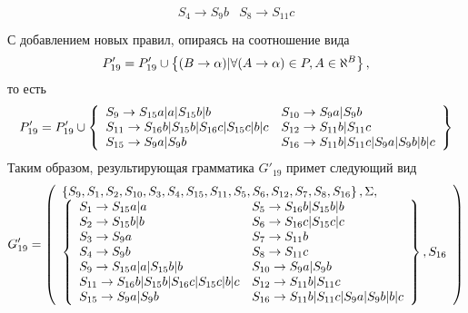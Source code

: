 \begin{itemize}
\begin{align*}
{\begin{array}{ll}
				      S_4 \to S_9b      & S_8 \to S_{11}c           \\
			      \end{array}
		      }
	      \end{align*}
	      С добавлением новых правил, опираясь на соотношение вида
	      \begin{align*}
		      P'_{19} = P'_{19} \cup \left\{(B \to \alpha) | \forall (A \to \alpha) \in P, A \in \aleph^B\right\},
	      \end{align*}
	      то есть
	      \begin{align*}
		      P'_{19} = P'_{19} \cup \left\{
			      \begin{array}{ll}
				      S_9 \to S_{15}a|a|S_{15}b|b                    & S_{10} \to S_9a|S_9b                     \\
				      S_{11} \to S_{16}b|S_{15}b|S_{16}c|S_{15}c|b|c & S_{12} \to S_{11}b|S_{11}c               \\
				      S_{15} \to S_9a|S_9b                           & S_{16} \to S_{11}b|S_{11}c|S_9a|S_9b|b|c
			      \end{array}
		      \right\}
	      \end{align*}
	      Таким образом, результирующая грамматика \(G'_{19}\) примет следующий вид
	      \begin{align*}
		      G'_{19} = \left( \begin{array}{l} \left\{S_9, S_1, S_2, S_{10}, S_3, S_4, S_{15}, S_{11}, S_5, S_6, S_{12}, S_7, S_8, S_{16}\right\}, \Sigma,\\\left\{\begin{array}{ll} 
		      S_1 \to S_{15}a|a                              & S_5 \to S_{16}b|S_{15}b|b                \\
		      S_2 \to S_{15}b|b                              & S_6 \to S_{16}c|S_{15}c|c                \\
		      S_3 \to S_9a                                   & S_7 \to S_{11}b                          \\
		      S_4 \to S_9b                                   & S_8 \to S_{11}c                          \\
		      S_9 \to S_{15}a|a|S_{15}b|b                    & S_{10} \to S_9a|S_9b                     \\
		      S_{11} \to S_{16}b|S_{15}b|S_{16}c|S_{15}c|b|c & S_{12} \to S_{11}b|S_{11}c               \\
		      S_{15} \to S_9a|S_9b                           & S_{16} \to S_{11}b|S_{11}c|S_9a|S_9b|b|c
		       \end{array}\right\}, S_{16} \end{array} \right)                                                                                 \\
	      \end{align*}

\end{itemize}
